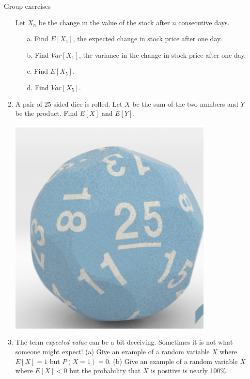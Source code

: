 \documentclass[10pt]{beamer}
\begin{document}
\begin{frame}{Group exercises}
\begin{enumerate}
	Let $X_n$ be the change in the value of the stock after $n$ consecutive days.
	 \begin{itemize} \footnotesize 
	\item[a.] Find $E[X_1]$, the expected change in stock price after one day. 
	\item[b.] Find  $Var[X_1]$, the variance in the change in stock price after one day. 
	\item[c.] Find $E[X_5]$.
	\item[d.] Find $Var[X_5]$.
	\end{itemize}
	\vspace{-.2cm}
	\item  \leavevmode
	\begin{minipage}{.70\textwidth}
	\footnotesize  A pair of 25-sided dice is rolled. Let $X$ be the sum of the two numbers and $Y$ be the product. Find $E[X]$ and $E[Y]$.
	\end{minipage} %
	\hfill 
	\begin{minipage}{.15\textwidth}
	\includegraphics[width=.7\linewidth]{images/25_sided_die}
	\end{minipage}
	\vspace{-.1cm}
	\item  The term \textit{expected value} can be a bit deceiving. Sometimes it is not what someone might expect! (a) Give an example of a random variable $X$ where $E[X]=1$ but $P(X=1)=0$.  (b) Give an example of a random variable $X$ where $E[X]<0$ but the probability that $X$ is positive is nearly 100\%.
\end{enumerate}

\end{frame}
\end{document}

